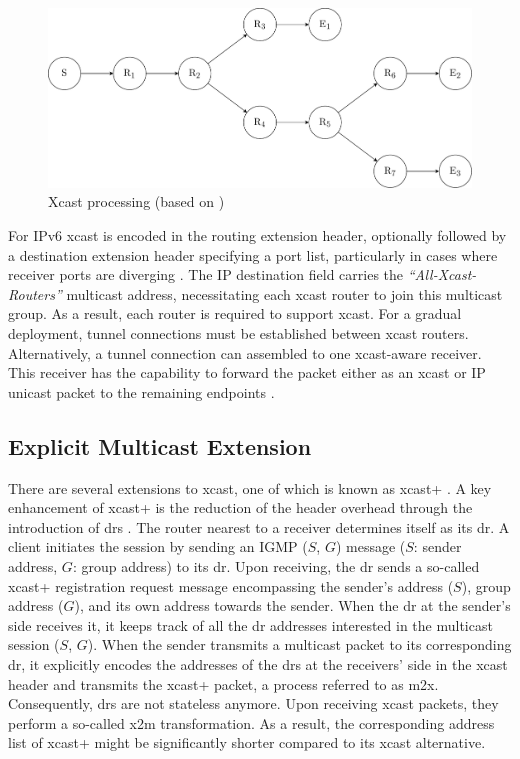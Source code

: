 \begin{figure}
    \centering
    \includegraphics[width=.75\textwidth]{Bilder/xcast.pdf}
    \caption{Xcast processing (based on \cite{xcast_rfc})}
    \label{fig:xcast}
\end{figure}

For IPv6 \gls{xcast} is encoded in the routing extension header, optionally
    followed by a destination extension header specifying a port list,
    particularly in cases where receiver ports are diverging \cite{xcast_rfc}.
The IP destination field carries the \textit{``All-Xcast-Routers''} multicast
    address, necessitating  each \gls{xcast} router to join this multicast
    group.
As a result, each router is required to support \gls{xcast}.
For a gradual deployment, tunnel connections must be established between
    \gls{xcast} routers.
Alternatively, a tunnel connection can assembled to one \gls{xcast}-aware
    receiver.
This receiver has the capability to forward the packet either as an \gls{xcast}
    or IP unicast packet to the remaining endpoints \cite{xcast_rfc}.

\subsection{Explicit Multicast Extension} %
\label{sub:Explicit Multicast Extension}
There are several extensions to \gls{xcast}, one of which is known as
    \gls{xcast+} \cite{xcast+}.
A key enhancement of \gls{xcast+} is the reduction of the header overhead
    through the introduction of \glspl{dr} \cite{xcast+}.
The router nearest to a receiver determines itself as its \gls{dr}.
A client initiates the session by sending an IGMP ($S$, $G$) message ($S$:
    sender address, $G$: group address) to its \gls{dr}.
Upon receiving, the \gls{dr} sends a so-called \gls{xcast+} registration
    request message encompassing the sender's address ($S$), group address
    ($G$), and its own address towards the sender.
When the \gls{dr} at the sender's side receives it, it keeps track of all the
    \gls{dr} addresses interested in the multicast session ($S$, $G$).
When the sender transmits a multicast packet to its corresponding \gls{dr},
    it explicitly encodes the addresses of the \glspl{dr} at the receivers'
    side in the \gls{xcast} header and transmits the \gls{xcast+} packet, a
    process referred to as \gls{m2x}.
Consequently, \glspl{dr} are not stateless anymore.
Upon receiving \gls{xcast} packets, they perform a so-called \gls{x2m}
    transformation.
As a result, the corresponding address list of \gls{xcast+} might be
    significantly shorter compared to its \gls{xcast} alternative.

